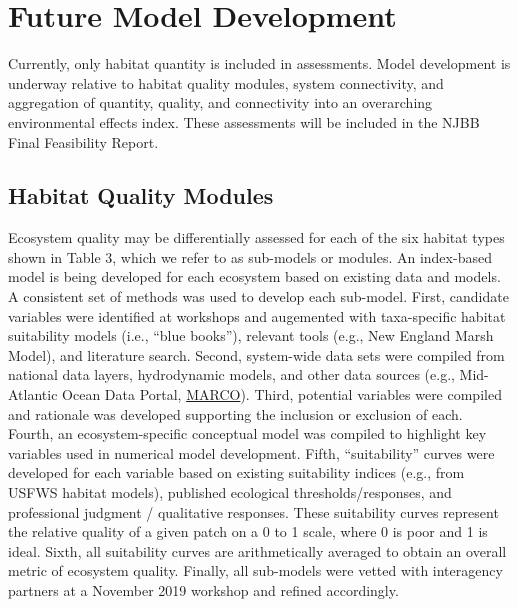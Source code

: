 \documentclass[
]{book}
\begin{document}
\hypertarget{future-model-development}{%
\section{Future Model Development}\label{future-model-development}}

Currently, only habitat quantity is included in assessments. Model development is underway relative to habitat quality modules, system connectivity, and aggregation of quantity, quality, and connectivity into an overarching environmental effects index. These assessments will be included in the NJBB Final Feasibility Report.

\hypertarget{habitat-quality-modules}{%
\subsection{Habitat Quality Modules}\label{habitat-quality-modules}}

Ecosystem quality may be differentially assessed for each of the six habitat types shown in Table 3, which we refer to as sub-models or modules. An index-based model is being developed for each ecosystem based on existing data and models. A consistent set of methods was used to develop each sub-model. First, candidate variables were identified at workshops and augemented with taxa-specific habitat suitability models (i.e., ``blue books''), relevant tools (e.g., New England Marsh Model), and literature search. Second, system-wide data sets were compiled from national data layers, hydrodynamic models, and other data sources (e.g., Mid-Atlantic Ocean Data Portal, \href{https://portal.midatlanticocean.org/}{MARCO}). Third, potential variables were compiled and rationale was developed supporting the inclusion or exclusion of each. Fourth, an ecosystem-specific conceptual model was compiled to highlight key variables used in numerical model development. Fifth, ``suitability'' curves were developed for each variable based on existing suitability indices (e.g., from USFWS habitat models), published ecological thresholds/responses, and professional judgment / qualitative responses. These suitability curves represent the relative quality of a given patch on a 0 to 1 scale, where 0 is poor and 1 is ideal. Sixth, all suitability curves are arithmetically averaged to obtain an overall metric of ecosystem quality. Finally, all sub-models were vetted with interagency partners at a November 2019 workshop and refined accordingly.
\end{document}
